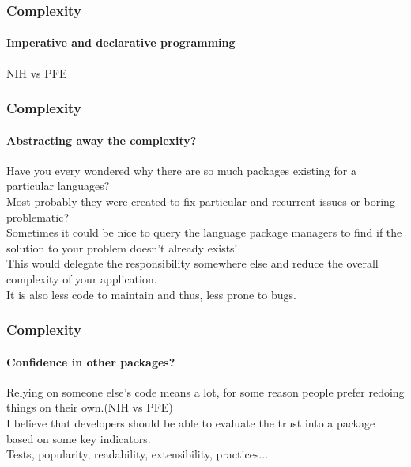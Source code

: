 \begin{frame}
  \frametitle{Complexity}
  \framesubtitle{Imperative and declarative programming}

  
  \pause
  

\end{frame}

\begin{frame}[fragile,c]
  \begin{center}
    \Huge
    NIH vs PFE
  \end{center}
\end{frame}

\begin{frame}
  \frametitle{Complexity}
  \framesubtitle{Abstracting away the complexity?}

  Have you every wondered why there are so much packages existing for a
  particular languages?\\
  \pause
  Most probably they were created to fix particular and recurrent issues or
  boring problematic?\\
  \pause
  Sometimes it could be nice to query the language package managers to find if
  the solution to your problem doesn't already exists!\\
  \pause
  This would delegate the responsibility somewhere else and reduce the overall
  complexity of your application.\\
  \pause
  It is also less code to maintain and thus, less prone to bugs.

\end{frame}

\begin{frame}
  \frametitle{Complexity}
  \framesubtitle{Confidence in other packages?}

  Relying on someone else's code means a lot, for some reason people prefer
  redoing things on their own.(NIH vs PFE)\\
  \pause
  \vfill
  I believe that developers should be able to evaluate the trust into a
  package based on some key indicators.\\
  \pause
  \vfill
  Tests, popularity, readability, extensibility, practices...
\end{frame}

